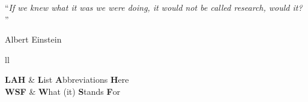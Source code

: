 \documentclass[
11pt, %
english, %
singlespacing, %
headsepline, %
]{MastersDoctoralThesis} %
\begin{document}
\cleardoublepage


\vspace*{0.2\textheight}

\noindent\enquote{\itshape If we knew what it was we were doing, it would not be called research, would it?
}\bigbreak

\hfill Albert Einstein


\begin{abstract}

\end{abstract}


\begin{acknowledgements}
\addchaptertocentry{\acknowledgementname} %

\end{acknowledgements}


\tableofcontents %

\listoffigures %

\listoftables %


\begin{abbreviations}{ll} %

\textbf{LAH} & \textbf{L}ist \textbf{A}bbreviations \textbf{H}ere\\
\textbf{WSF} & \textbf{W}hat (it) \textbf{S}tands \textbf{F}or\\

\end{abbreviations}
\end{document}
